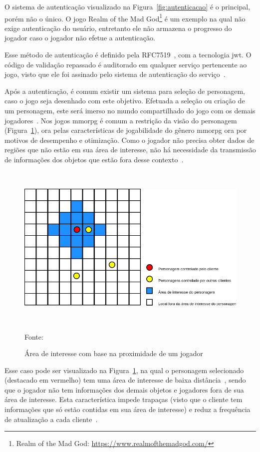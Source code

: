 O sistema de autenticação visualizado na Figura~\ref{fig:autenticacao} é o principal, porém não o único.
%
O jogo Realm of the Mad God\footnote{Realm of the Mad God: \url{https://www.realmofthemadgod.com/}} é um exemplo na qual não exige autenticação do usuário, entretanto ele não armazena o progresso do jogador caso o jogador não efetue a autenticação.


Esse método de autenticação é definido pela RFC7519~\cite{rfc7519}, com a tecnologia \ac{jwt}.
%
O código de validação repassado é auditorado em qualquer serviço pertencente ao jogo, visto que ele foi assinado pelo sistema de autenticação do serviço~\cite{Ikem2018May}.


Após a autenticação, é comum existir um sistema para seleção de personagem, caso o jogo seja desenhado com este objetivo.
%
Efetuada a seleção ou criação de um personagem, este será imerso no mundo compartilhado do jogo com os demais jogadores~\cite{matthiasrudy2011}.
%
Nos jogos \ac{mmorpg} é comum a restrição da visão do personagem (Figura~\ref{fig:proximidade}), ora pelas características de jogabilidade do gênero \ac{mmorpg} ora por motivos de desempenho e otimização.
%
Como o jogador não precisa obter dados de regiões que não estão em sua área de interesse, não há necessidade da transmissão de informações dos objetos que estão fora desse contexto~\cite{albion_online_unite}.

\begin{figure}[htb!]
\caption{Área de interesse com base na proximidade de um jogador}
\label{fig:proximidade}
\includegraphics[height=8cm]{img/cap2/proximidade.png}
\centering

Fonte:~\cite{albion_online_unite}
\end{figure}


Esse caso pode ser visualizado na Figura~\ref{fig:proximidade}, na qual o personagem selecionado (destacado em vermelho) tem uma área de interesse de baixa distância~\cite{albion_online_unite}, sendo que o jogador não tem informações dos demais objetos e jogadores fora de sua área de interesse.
%
Esta característica impede trapaças (visto que o cliente tem informações que só estão contidas em sua área de interesse) e reduz a frequência de atualização a cada cliente~\cite{albion_online_unite}.


